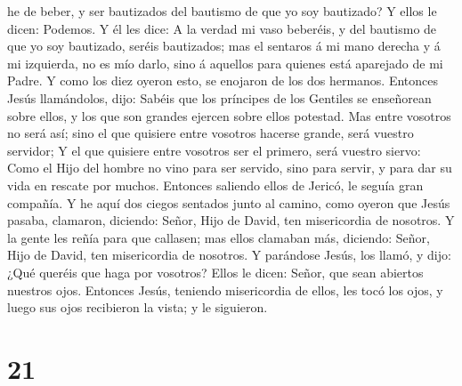 he de beber, y ser bautizados del bautismo de que yo soy bautizado? Y
ellos le dicen: Podemos.  Y él les dice: A la verdad mi
vaso beberéis, y del bautismo de que yo soy bautizado, seréis
bautizados; mas el sentaros á mi mano derecha y á mi izquierda, no es
mío darlo, sino á aquellos para quienes está aparejado de mi Padre.
 Y como los diez oyeron esto, se enojaron de los dos
hermanos.  Entonces Jesús llamándolos, dijo: Sabéis que
los príncipes de los Gentiles se enseñorean sobre ellos, y los que son
grandes ejercen sobre ellos potestad.  Mas entre vosotros
no será así; sino el que quisiere entre vosotros hacerse grande, será
vuestro servidor;  Y el que quisiere entre vosotros ser
el primero, será vuestro siervo:  Como el Hijo del hombre
no vino para ser servido, sino para servir, y para dar su vida en
rescate por muchos.  Entonces saliendo ellos de Jericó,
le seguía gran compañía.  Y he aquí dos ciegos sentados
junto al camino, como oyeron que Jesús pasaba, clamaron, diciendo:
Señor, Hijo de David, ten misericordia de nosotros.  Y la
gente les reñía para que callasen; mas ellos clamaban más, diciendo:
Señor, Hijo de David, ten misericordia de nosotros.  Y
parándose Jesús, los llamó, y dijo: ¿Qué queréis que haga por vosotros?
 Ellos le dicen: Señor, que sean abiertos nuestros ojos.
 Entonces Jesús, teniendo misericordia de ellos, les tocó
los ojos, y luego sus ojos recibieron la vista; y le siguieron.

\hypertarget{section-20}{%
\section{21}\label{section-20}}

